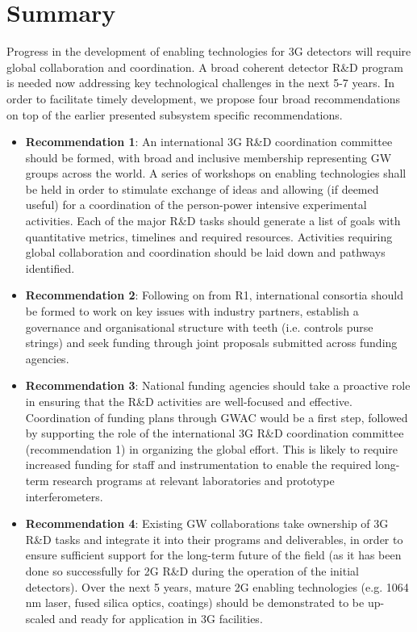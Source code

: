\chapter{Summary}
\label{sec:Summary}
\vspace{1cm}
Progress in the development of enabling technologies for 3G detectors will require global collaboration and coordination. A broad coherent detector R\&D program is needed now addressing key technological challenges in the next 5-7 years. In order to facilitate timely development, we propose four broad recommendations on top of the earlier presented subsystem specific recommendations.

\begin{itemize}
\item \textbf{Recommendation 1}:  An international 3G R\&D coordination committee should be formed, with broad and inclusive membership representing GW groups across the world. A series of workshops on enabling technologies shall be held in order to stimulate exchange of ideas and allowing (if deemed useful) for a coordination of the person-power intensive experimental activities.  Each of the major R\&D tasks should generate a list of  goals with quantitative metrics,  timelines and required resources.   Activities requiring global collaboration and coordination should be laid down and pathways identified.
\item \textbf{Recommendation 2}:  Following on from R1, international consortia should be formed to work on key issues with industry partners, establish a governance and organisational structure with teeth (i.e. controls purse strings) and seek funding through joint proposals submitted across funding agencies. 
\item \textbf{Recommendation 3}: National funding agencies should take a proactive role in ensuring that the R\&D activities are well-focused and effective.  Coordination of funding plans through GWAC would be a first step, followed by supporting the role of the international 3G R\&D coordination committee (recommendation 1) in organizing the global effort.  This is likely to require increased funding for staff and instrumentation to enable the required long-term research programs at relevant laboratories and prototype interferometers.
\item \textbf{Recommendation 4}: Existing GW collaborations take ownership of 3G R\&D tasks and integrate it into their programs and deliverables, in order to ensure sufficient support for the long-term future of the field (as it has been done so successfully for 2G R\&D during the operation of the initial detectors). Over the next 5 years, mature 2G enabling technologies (e.g. 1064\,nm laser, fused silica optics, coatings) should be demonstrated to be up-scaled and ready for application in 3G facilities.
\end{itemize}
